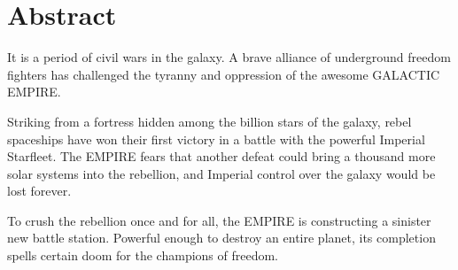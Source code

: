 \section*{Abstract}

It is a period of civil wars in the galaxy. A brave alliance of underground freedom fighters has challenged the tyranny and oppression of the awesome GALACTIC EMPIRE.

Striking from a fortress hidden among the billion stars of the galaxy, rebel spaceships have won their first victory in a battle with the powerful Imperial Starfleet. The EMPIRE fears that another defeat could bring a thousand more solar systems into the rebellion, and Imperial control over the galaxy would be lost forever.

To crush the rebellion once and for all, the EMPIRE is constructing a sinister new battle station. Powerful enough to destroy an entire planet, its completion spells certain doom for the champions of freedom.
